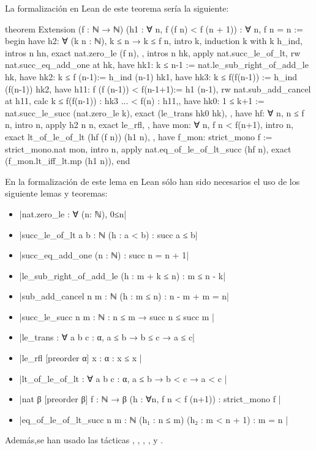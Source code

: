 La formalización en Lean de este teorema sería la siguiente:
\begin{leancode}
theorem Extension
  (f : ℕ → ℕ)
  (h1 : ∀ n, f (f n) < f (n + 1))
  : ∀ n, f n = n :=
begin
  have h2: ∀ (k n : ℕ), k ≤ n → k ≤ f n,
  { intro k,
     induction k with k h_ind,
     { intros n hn,
       exact nat.zero_le (f n), },
     { intros n hk,
       apply nat.succ_le_of_lt,
       rw nat.succ_eq_add_one at hk,
       have hk1: k ≤ n-1 := nat.le_sub_right_of_add_le hk,
       have hk2: k ≤ f (n-1):= h_ind (n-1) hk1,
       have hk3: k ≤ f(f(n-1)) := h_ind (f(n-1)) hk2,
       have h11: f (f (n-1)) < f(n-1+1):= h1 (n-1),
       rw nat.sub_add_cancel at h11,
       { calc k ≤ f(f(n-1)) : hk3
            ... < f(n)      : h11,},
       have hk0: 1 ≤ k+1 := nat.succ_le_succ (nat.zero_le k),
       exact (le_trans hk0 hk), }},
  have hf: ∀ n, n ≤ f n,
    { intro n,
      apply h2 n n,
      exact le_rfl, },
  have mon: ∀ n, f n < f(n+1),
    { intro n,
      exact lt_of_le_of_lt (hf (f n)) (h1 n), },
  have f_mon: strict_mono f := strict_mono.nat mon,
  intro n,
  apply nat.eq_of_le_of_lt_succ (hf n),
  exact (f_mon.lt_iff_lt.mp (h1 n)),
end
\end{leancode}

En la formalización de este lema en Lean sólo han sido necesarios el uso
de los siguiente lemas y teoremas:
\begin{itemize}
\item {}|nat.zero_le : ∀ (n: ℕ), 0≤n|
\item {}|succ_le_of_lt {a b : ℕ} (h : a < b) : succ a ≤ b|
\item {}|succ_eq_add_one (n : ℕ) : succ n = n + 1|
\item {}|le_sub_right_of_add_le (h : m + k ≤ n) : m ≤ n - k|
\item {}|sub_add_cancel {n m : ℕ} (h : m ≤ n) : n - m + m = n|
\item {}|succ_le_succ {n m : ℕ} : n ≤ m → succ n ≤ succ m |
\item {}|le_trans : ∀ {a b c : α}, a ≤ b → b ≤ c → a ≤ c|
\item {}|le_rfl [preorder α] {x : α} : x ≤ x |
\item {}|lt_of_le_of_lt : ∀ {a b c : α}, a ≤ b → b < c → a < c |
\item {}|nat {β} [preorder β] {f : ℕ → β} (h : ∀n, f n < f (n+1)) :  strict_mono f |
\item {}|eq_of_le_of_lt_succ {n m : ℕ} (h₁ : n ≤ m) (h₂ : m < n + 1) : m = n |
\end{itemize}
Además,se han usado las tácticas
,
,
,
,
 y
.


